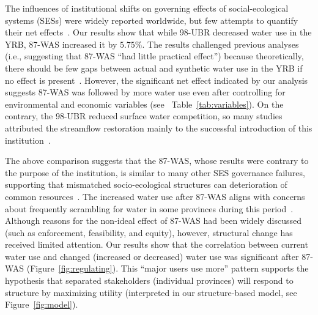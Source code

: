 
The influences of institutional shifts on governing effects of social-ecological systems (SESs) were widely reported worldwide, but few attempts to quantify their net effects~\cite{cumming2020a}.
Our results show that while 98-UBR decreased water use in the YRB, 87-WAS increased it by $5.75\%$.
The results challenged previous analyses (i.e., suggesting that 87-WAS ``had little practical effect'') because theoretically, there should be few gaps between actual and synthetic water use in the YRB if no effect is present~\cite{abadie2015,hill2021}.
However, the significant net effect indicated by our analysis suggests 87-WAS was followed by more water use even after controlling for environmental and economic variables (see \textit{}~Table~\ref{tab:variables}).
On the contrary, the 98-UBR reduced surface water competition, so many studies attributed the streamflow restoration mainly to the successful introduction of this institution~\cite{chen2021,huangang2002,an2007}.

The above comparison suggests that the 87-WAS, whose results were contrary to the purpose of the institution, is similar to many other SES governance failures, supporting that mismatched socio-ecological structures can deterioration of common resources~\cite{kellenberg2009,cai2016,barnes2019}.
The increased water use after 87-WAS aligns with concerns about frequently scrambling for water in some provinces during this period~\cite{mao2000, bouckaert2022}.
Although reasons for the non-ideal effect of 87-WAS had been widely discussed~\cite{huangang2002} (such as enforcement, feasibility, and equity), however, structural change has received limited attention.
Our results show that the correlation between current water use and changed (increased or decreased) water use was significant after 87-WAS (Figure~\ref{fig:regulating}).
This ``major users use more'' pattern supports the hypothesis that separated stakeholders (individual provinces) will respond to structure by maximizing utility (interpreted in our structure-based model, see Figure~\ref{fig:model}).

